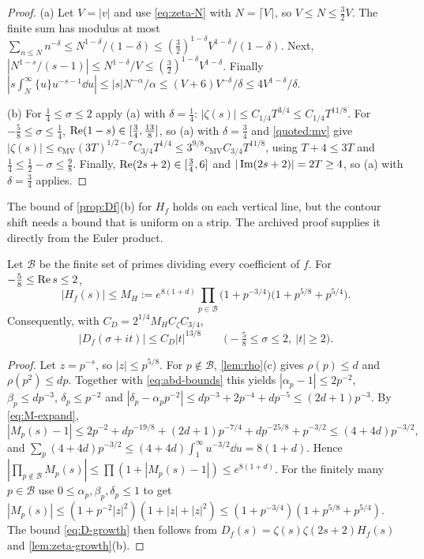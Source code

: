 \begin{proof}
(a) Let $V=|v|$ and use \eqref{eq:zeta-N} with $N=\lceil V\rceil$, so $V\le N\le\frac32V$. The finite sum has modulus at most $\sum_{n\le N}n^{-\delta}\le N^{1-\delta}/(1-\delta)\le(\frac32)^{1-\delta}V^{1-\delta}/(1-\delta)$. Next, $|N^{1-s}/(s-1)|\le N^{1-\delta}/V\le(\frac32)^{1-\delta}V^{1-\delta}$. Finally $|s\int_N^\infty\{u\}u^{-s-1}\dd u|\le|s|N^{-\alpha}/\alpha\le(V+6)V^{-\delta}/\delta\le4V^{1-\delta}/\delta$.

(b) For $\frac14\le\sigma\le2$ apply (a) with $\delta=\frac14$: $|\zeta(s)|\le C_{1/4}T^{3/4}\le C_{1/4}T^{11/8}$. For $-\frac58\le\sigma\le\frac14$, $\operatorname{Re}(1-s)\in[\frac34,\frac{13}8]$, so (a) with $\delta=\frac34$ and \cref{quoted:mv} give $|\zeta(s)|\le c_{\mathrm{MV}}(3T)^{1/2-\sigma}C_{3/4}T^{1/4}\le3^{9/8}c_{\mathrm{MV}}C_{3/4}T^{11/8}$, using $T+4\le3T$ and $\frac14\le\frac12-\sigma\le\frac98$. Finally, $\operatorname{Re}(2s+2)\in[\frac34,6]$ and $|\operatorname{Im}(2s+2)|=2T\ge4$, so (a) with $\delta=\frac34$ applies.
\end{proof}

The bound of \cref{prop:Df}(b) for $H_f$ holds on each vertical line, but the contour shift needs a bound that is uniform on a strip. The archived proof supplies it directly from the Euler product.

\begin{lemma}\label{lem:H-strip}
Let $\mathcal B$ be the finite set of primes dividing every coefficient of $f$. For $-\frac58\le\operatorname{Re} s\le2$,
\[
|H_f(s)|\le M_H:=e^{8(1+d)}\prod_{p\in\mathcal B}\bigl(1+p^{-3/4}\bigr)\bigl(1+p^{5/8}+p^{5/4}\bigr).
\]
Consequently, with $C_D=2^{1/4}M_HC_\zeta C_{3/4}$,
\begin{equation}\label{eq:D-growth}
|D_f(\sigma+it)|\le C_D|t|^{13/8}\qquad\bigl(-\tfrac58\le\sigma\le2,\ |t|\ge2\bigr).
\end{equation}
\end{lemma}

\begin{proof}
Let $z=p^{-s}$, so $|z|\le p^{5/8}$. For $p\notin\mathcal B$, \cref{lem:rho}(c) gives $\rho(p)\le d$ and $\rho(p^2)\le dp$. Together with \eqref{eq:abd-bounds} this yields $|\alpha_p-1|\le2p^{-2}$, $\beta_p\le dp^{-3}$, $\delta_p\le p^{-2}$ and $|\delta_p-\alpha_pp^{-2}|\le dp^{-3}+2p^{-4}+dp^{-5}\le(2d+1)p^{-3}$. By \eqref{eq:M-expand},
\[
|M_p(s)-1|\le2p^{-2}+dp^{-19/8}+(2d+1)p^{-7/4}+dp^{-25/8}+p^{-3/2}\le(4+4d)p^{-3/2},
\]
and $\sum_p(4+4d)p^{-3/2}\le(4+4d)\int_1^\infty u^{-3/2}\dd u=8(1+d)$. Hence $|\prod_{p\notin\mathcal B}M_p(s)|\le\prod(1+|M_p(s)-1|)\le e^{8(1+d)}$. For the finitely many $p\in\mathcal B$ use $0\le\alpha_p,\beta_p,\delta_p\le1$ to get $|M_p(s)|\le(1+p^{-2}|z|^2)(1+|z|+|z|^2)\le(1+p^{-3/4})(1+p^{5/8}+p^{5/4})$. The bound \eqref{eq:D-growth} then follows from $D_f(s)=\zeta(s)\zeta(2s+2)H_f(s)$ and \cref{lem:zeta-growth}(b).
\end{proof}

